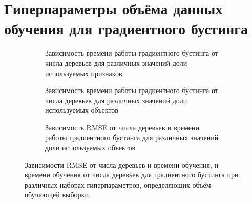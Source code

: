 \documentclass[a4paper, 14pt]{article}
\begin{document}
\newpage



\newpage
\appendix 
\section{Гиперпараметры объёма данных обучения для градиентного бустинга}\label{appendix:gb_hyp}
    \begin{figure}[h]
    \begin{subfigure}{.47\textwidth}
        \centering
        
        \caption{Зависимость времени работы градиентного бустинга от числа деревьев для различных значений доли используемых признаков}
    \end{subfigure}
    \begin{subfigure}{.47\textwidth}
        \centering
        
        \caption{Зависимость времени работы градиентного бустинга от числа деревьев для различных значений доли используемых объектов}
    \end{subfigure}
    \center
    \begin{subfigure}{\textwidth}
        \centering
        
        \caption{Зависимость RMSE от числа деревьев и времени работы градиентного бустинга для различных значений доли используемых объектов}
    \end{subfigure}
    \caption{Зависимости RMSE от числа деревьев и времени обучения, и времени обучения от числа деревьев для градиентного бустинга при различных наборах гиперпараметров, определяющих объём обучающей выборки.}
    
    \end{figure}
\end{document}
